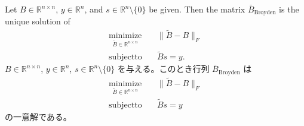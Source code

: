 \documentclass[0_main]{subfiles}
\begin{document}
\begin{proposition}
    \ifEn
        Let $B\in\mathbb{R}^{n\times n}$, $y\in\mathbb{R}^n$, and $s\in\mathbb{R}^n\setminus\{ 0 \}$ be given.
        Then the matrix $\bar{B}_{\mathrm{Broyden}}$ is the unique solution of
        \begin{align*}
            \underset{\tilde{B} \in \mathbb{R}^{n \times n}}{\mathrm{minimize}} & \quad \lVert \tilde{B} - B \rVert_F \\
            \mathrm{subject to}                                                 & \quad \tilde{B} s = y.
        \end{align*}
    \else
        $B\in\mathbb{R}^{n\times n}$, $y\in\mathbb{R}^n$, $s\in\mathbb{R}^n\setminus\{ 0 \}$ を与える。このとき行列 $\bar{B}_{\mathrm{Broyden}}$ は
        \begin{align*}
            \underset{\tilde{B} \in \mathbb{R}^{n \times n}}{\mathrm{minimize}} & \quad \lVert \tilde{B} - B \rVert_F \\
            \mathrm{subject to}                                                 & \quad \tilde{B} s = y
        \end{align*}
        の一意解である。
    \fi
\end{proposition}
\end{document}
